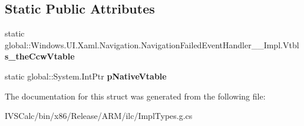 \subsection*{Static Public Attributes}
\begin{DoxyCompactItemize}
\item 
\mbox{\label{struct_windows_1_1_u_i_1_1_xaml_1_1_navigation_1_1_navigation_failed_event_handler_____impl_1_1_vtbl_acdf92c7a76b9e4187fb62ef3b80c2ef1}} 
static global\+::\+Windows.\+U\+I.\+Xaml.\+Navigation.\+Navigation\+Failed\+Event\+Handler\+\_\+\+\_\+\+Impl.\+Vtbl {\bfseries s\+\_\+the\+Ccw\+Vtable}
\item 
\mbox{\label{struct_windows_1_1_u_i_1_1_xaml_1_1_navigation_1_1_navigation_failed_event_handler_____impl_1_1_vtbl_afae88277857805c73c6885de9fc85195}} 
static global\+::\+System.\+Int\+Ptr {\bfseries p\+Native\+Vtable}
\end{DoxyCompactItemize}


The documentation for this struct was generated from the following file\+:\begin{DoxyCompactItemize}
\item 
I\+V\+S\+Calc/bin/x86/\+Release/\+A\+R\+M/ilc/Impl\+Types.\+g.\+cs\end{DoxyCompactItemize}
